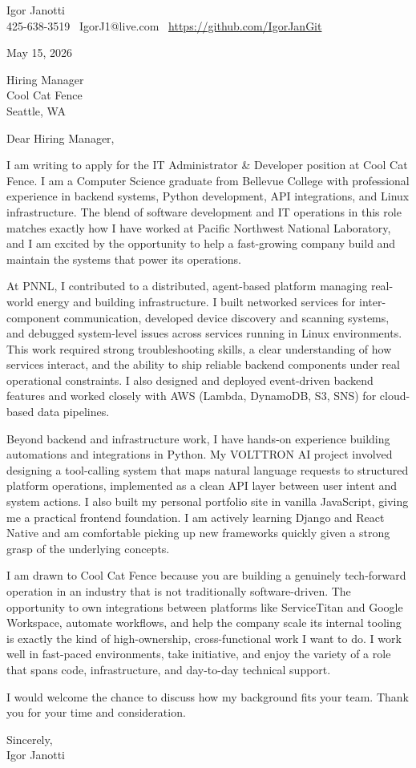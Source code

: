 \documentclass[11pt]{article}
\begin{document}
Igor Janotti\\
425-638-3519 \textbar\ IgorJ1@live.com \textbar\ \url{https://github.com/IgorJanGit}

May 15, 2026

Hiring Manager\\
Cool Cat Fence\\
Seattle, WA

Dear Hiring Manager,

I am writing to apply for the IT Administrator \& Developer position at Cool Cat Fence. I am a Computer Science graduate from Bellevue College with professional experience in backend systems, Python development, API integrations, and Linux infrastructure. The blend of software development and IT operations in this role matches exactly how I have worked at Pacific Northwest National Laboratory, and I am excited by the opportunity to help a fast-growing company build and maintain the systems that power its operations.

At PNNL, I contributed to a distributed, agent-based platform managing real-world energy and building infrastructure. I built networked services for inter-component communication, developed device discovery and scanning systems, and debugged system-level issues across services running in Linux environments. This work required strong troubleshooting skills, a clear understanding of how services interact, and the ability to ship reliable backend components under real operational constraints. I also designed and deployed event-driven backend features and worked closely with AWS (Lambda, DynamoDB, S3, SNS) for cloud-based data pipelines.

Beyond backend and infrastructure work, I have hands-on experience building automations and integrations in Python. My VOLTTRON AI project involved designing a tool-calling system that maps natural language requests to structured platform operations, implemented as a clean API layer between user intent and system actions. I also built my personal portfolio site in vanilla JavaScript, giving me a practical frontend foundation. I am actively learning Django and React Native and am comfortable picking up new frameworks quickly given a strong grasp of the underlying concepts.

I am drawn to Cool Cat Fence because you are building a genuinely tech-forward operation in an industry that is not traditionally software-driven. The opportunity to own integrations between platforms like ServiceTitan and Google Workspace, automate workflows, and help the company scale its internal tooling is exactly the kind of high-ownership, cross-functional work I want to do. I work well in fast-paced environments, take initiative, and enjoy the variety of a role that spans code, infrastructure, and day-to-day technical support.

I would welcome the chance to discuss how my background fits your team. Thank you for your time and consideration.

Sincerely,\\
Igor Janotti
\end{document}
